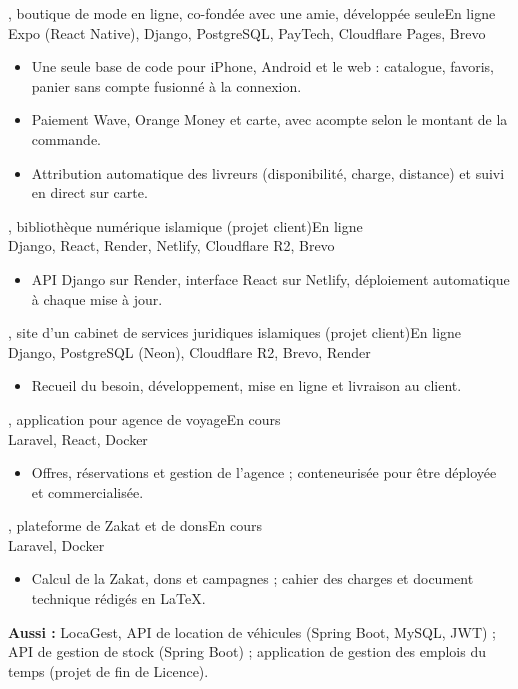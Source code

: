 \documentclass[10pt,a4paper]{article}
\newcommand{\projet}[4]{%
  \vspace{5pt}{\bfseries #1}, #2\hfill{\color{gris}\small #4}\\
  {\color{gris}\small #3}\par}
\begin{document}
\projet{GlowLuxe By SoFa}{boutique de mode en ligne, co-fondée avec une amie, développée seule}
{Expo (React Native), Django, PostgreSQL, PayTech, Cloudflare Pages, Brevo}{En ligne}
\begin{itemize}
  \item Une seule base de code pour iPhone, Android et le web : catalogue, favoris, panier sans compte
        fusionné à la connexion.
  \item Paiement Wave, Orange Money et carte, avec acompte selon le montant de la commande.
  \item Attribution automatique des livreurs (disponibilité, charge, distance) et suivi en direct sur carte.
\end{itemize}

\projet{Bayt Al-Ilm CATK}{bibliothèque numérique islamique (projet client)}
{Django, React, Render, Netlify, Cloudflare R2, Brevo}{En ligne}
\begin{itemize}
  \item API Django sur Render, interface React sur Netlify, déploiement automatique à chaque mise à jour.
\end{itemize}

\projet{KSJI}{site d'un cabinet de services juridiques islamiques (projet client)}
{Django, PostgreSQL (Neon), Cloudflare R2, Brevo, Render}{En ligne}
\begin{itemize}
  \item Recueil du besoin, développement, mise en ligne et livraison au client.
\end{itemize}

\projet{Teranga Voyages}{application pour agence de voyage}{Laravel, React, Docker}{En cours}
\begin{itemize}
  \item Offres, réservations et gestion de l'agence ; conteneurisée pour être déployée et commercialisée.
\end{itemize}

\projet{Al-Barakah}{plateforme de Zakat et de dons}{Laravel, Docker}{En cours}
\begin{itemize}
  \item Calcul de la Zakat, dons et campagnes ; cahier des charges et document technique rédigés en LaTeX.
\end{itemize}

\vspace{4pt}
{\bfseries Aussi :} LocaGest, API de location de véhicules (Spring Boot, MySQL, JWT) ; API de gestion de
stock (Spring Boot) ; application de gestion des emplois du temps (projet de fin de Licence).
\end{document}
